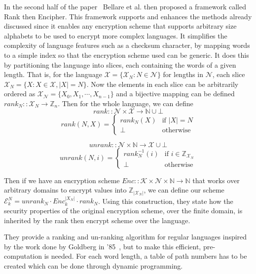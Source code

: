 \documentclass[ %
                    author={Samuel Russell},
                supervisor={Prof. Bogdan Warinschi},
                    degree={MEng},
                     title={Innocuous Ciphertexts},
                  subtitle={The DE-CENSOR Scheme},
                      type={Research},
                      year={2018} ]{dissertation}
\begin{document}
In the second half of the paper~\cite{fpe} Bellare et al. then proposed a framework called Rank then Encipher. This framework supports and enhances the methods already discussed since it enables any encryption scheme that supports arbitrary size alphabets to be used to encrypt more complex languages. It simplifies the complexity of language features such as a checksum character, by mapping words to a simple index so that the encryption scheme used can be generic. It does this by partitioning the language into slices, each containing the words of a given length. That is, for the language $\mathcal{X} = \{\mathcal{X}_N : N \in \mathcal{N} \}$ for lengths in $\mathcal{N}$, each slice $\mathcal{X}_N = \{ X : X \in \mathcal{X}, \vert X \vert = N  \}$. Now the elements in each slice can be arbitrarily ordered as $\mathcal{X_N} = \{ X_0, X_1, \cdots , X_{n-1} \} $ and a bijective mapping can be defined $rank_N :: \mathcal{X}_N \rightarrow \mathbb{Z}_n$.
Then for the whole language, we can define
$$ rank :: \mathcal{N} \times \mathcal{X} \rightarrow \mathbb{N} \cup \bot $$
$$ rank(N,X) =
\left\{
    \begin{array}{ll}
        rank_N(X)  & \mbox{if } \vert X \vert = N\\
        \bot & \mbox{otherwise}
    \end{array}
\right.
$$

$$ unrank :: \mathcal{N} \times \mathbb{N} \rightarrow \mathcal{X} \cup \bot $$
$$ unrank(N,i) =
\left\{
    \begin{array}{ll}
        rank_N^{-1}(i)  & \mbox{if } i \in \mathbb{Z}_{\mathcal{X}_N}\\
        \bot & \mbox{otherwise}
    \end{array}
\right.
$$

Then if we have an encryption scheme $Enc :: \mathcal{K} \times \mathcal{N} \times \mathbb{N} \rightarrow \mathbb{N}$ that works over arbitrary domains to encrypt values into $\mathbb{Z}_{|\mathcal{X}_N|}$, we can define our scheme $\mathcal{E}_k^N = unrank_N \cdot Enc_k^{|X_N|} \cdot rank_N$. Using this construction, they state how the security properties of the original encryption scheme, over the finite domain, is inherited by the rank then encrypt scheme over the language.

They provide a ranking and un-ranking algorithm for regular languages inspired by the work done by Goldberg in '85~\cite{rank}, but to make this efficient, pre-computation is needed. For each word length, a table of path numbers has to be created which can be done through dynamic programming.
\end{document}

